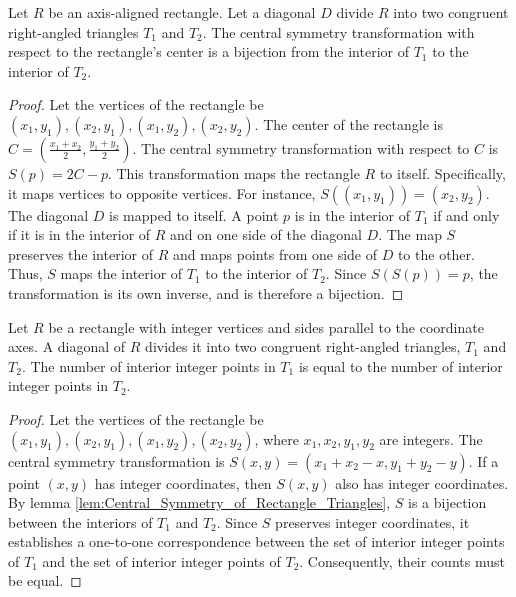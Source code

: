\begin{lemma}
    \label{lem:Central_Symmetry_of_Rectangle_Triangles}
    Let $R$ be an axis-aligned rectangle. Let a diagonal $D$ divide $R$ into two congruent right-angled triangles $T_1$ and $T_2$. The central symmetry transformation with respect to the rectangle's center is a bijection from the interior of $T_1$ to the interior of $T_2$.
\end{lemma}

\begin{proof}
    Let the vertices of the rectangle be $(x_1, y_1), (x_2, y_1), (x_1, y_2), (x_2, y_2)$. The center of the rectangle is $C = (\frac{x_1+x_2}{2}, \frac{y_1+y_2}{2})$. The central symmetry transformation with respect to $C$ is $S(p) = 2C - p$.
    This transformation maps the rectangle $R$ to itself. Specifically, it maps vertices to opposite vertices. For instance, $S((x_1,y_1)) = (x_2,y_2)$.
    The diagonal $D$ is mapped to itself. A point $p$ is in the interior of $T_1$ if and only if it is in the interior of $R$ and on one side of the diagonal $D$. The map $S$ preserves the interior of $R$ and maps points from one side of $D$ to the other. Thus, $S$ maps the interior of $T_1$ to the interior of $T_2$.
    Since $S(S(p)) = p$, the transformation is its own inverse, and is therefore a bijection.
\end{proof}

\begin{lemma}
    \label{lem:Symmetry_of_Lattice_Points}
    Let $R$ be a rectangle with integer vertices and sides parallel to the coordinate axes. A diagonal of $R$ divides it into two congruent right-angled triangles, $T_1$ and $T_2$. The number of interior integer points in $T_1$ is equal to the number of interior integer points in $T_2$.
\end{lemma}

\begin{proof}
    Let the vertices of the rectangle be $(x_1, y_1), (x_2, y_1), (x_1, y_2), (x_2, y_2)$, where $x_1, x_2, y_1, y_2$ are integers. The central symmetry transformation is $S(x,y) = (x_1+x_2-x, y_1+y_2-y)$.
    If a point $(x,y)$ has integer coordinates, then $S(x,y)$ also has integer coordinates.
    By lemma \ref{lem:Central_Symmetry_of_Rectangle_Triangles}, $S$ is a bijection between the interiors of $T_1$ and $T_2$.
    Since $S$ preserves integer coordinates, it establishes a one-to-one correspondence between the set of interior integer points of $T_1$ and the set of interior integer points of $T_2$. Consequently, their counts must be equal.
\end{proof}

